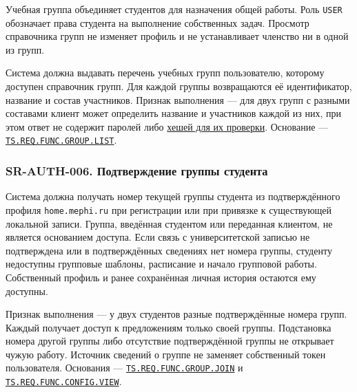 \documentclass[12pt,a4paper]{article}
\begin{document}
\hypertarget{sr-auth-005-перечень-учебных-групп}{}

\hypertarget{sr-auth-005}{}

Учебная группа объединяет студентов для назначения общей работы. Роль \texttt{USER} обозначает права студента на выполнение собственных задач. Просмотр справочника групп не изменяет профиль и не устанавливает членство ни в одной из групп.

Система должна выдавать перечень учебных групп пользователю, которому доступен справочник групп. Для каждой группы возвращаются её идентификатор, название и состав участников. Признак выполнения --- для двух групп с разными составами клиент может определить название и участников каждой из них, при этом ответ не содержит паролей либо {\hyperlink{sr-auth-008-защита-паролей}{хешей для их проверки}}. Основание --- {\href{../02\_Техническое\_задание/Техническое\_задание.pdf\#ts-req-func-group-list}{\texttt{TS.\allowbreak{}REQ.\allowbreak{}FUNC.\allowbreak{}GROUP.\allowbreak{}LIST}}}.

\subsubsection{SR-AUTH-006. Подтверждение группы студента}\label{sr-auth-006-ux43fux43eux434ux442ux432ux435ux440ux436ux434ux435ux43dux438ux435-ux433ux440ux443ux43fux43fux44b-ux441ux442ux443ux434ux435ux43dux442ux430}

\hypertarget{sr-auth-006-подтверждение-группы-студента}{}

\hypertarget{sr-auth-006}{}

Система должна получать номер текущей группы студента из подтверждённого профиля \texttt{home.\allowbreak{}mephi.\allowbreak{}ru} при регистрации или при привязке к существующей локальной записи. Группа, введённая студентом или переданная клиентом, не является основанием доступа. Если связь с университетской записью не подтверждена или в подтверждённых сведениях нет номера группы, студенту недоступны групповые шаблоны, расписание и начало групповой работы. Собственный профиль и ранее сохранённая личная история остаются ему доступны.

Признак выполнения --- у двух студентов разные подтверждённые номера групп. Каждый получает доступ к предложениям только своей группы. Подстановка номера другой группы либо отсутствие подтверждённой группы не открывает чужую работу. Источник сведений о группе не заменяет собственный токен пользователя. Основания --- {\href{../02\_Техническое\_задание/Техническое\_задание.pdf\#ts-req-func-group-join}{\texttt{TS.\allowbreak{}REQ.\allowbreak{}FUNC.\allowbreak{}GROUP.\allowbreak{}JOIN}}} и {\href{../02\_Техническое\_задание/Техническое\_задание.pdf\#ts-req-func-config-view}{\texttt{TS.\allowbreak{}REQ.\allowbreak{}FUNC.\allowbreak{}CONFIG.\allowbreak{}VIEW}}}.
\end{document}
